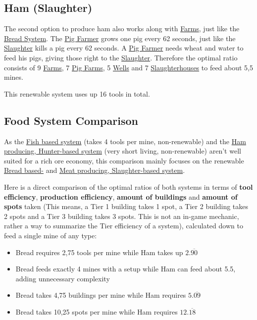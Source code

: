 \documentclass[12pt]{article}
\begin{document}
\subsection{Ham (Slaughter)}
\label{sec:hamslaughter}

The second option to produce ham also works along with \hyperref[sec:farm]{Farms}, just like the \hyperref[sec:bread]{Bread System}. The \hyperref[sec:pigfarm]{Pig Farmer} grows one pig every 62 seconds, just like the \hyperref[sec:slaughterhouse]{Slaughter} kills a pig every 62 seconds. A \hyperref[sec:pigfarm]{Pig Farmer} needs wheat and water to feed his pigs, giving those right to the \hyperref[sec:slaughterhouse]{Slaughter}. Therefore the optimal ratio consists of 9 \hyperref[sec:farm]{Farms}, 7 \hyperref[sec:pigfarm]{Pig Farms}, 5 \hyperref[sec:well]{Wells} and 7 \hyperref[sec:slaughterhouse]{Slaughterhouses} to feed about 5,5 mines.

This renewable system uses up 16 tools in total.

\subsection{Food System Comparison}
\label{sec:foodsystemcomparison}

As the \hyperref[sec:fish]{Fish based system} (takes 4 tools per mine, non-renewable) and the \hyperref[sec:hamhunter]{Ham producing, Hunter-based system} (very short living, non-renewable) aren't well suited for a rich ore economy, this comparison mainly focuses on the renewable \hyperref[sec:bread]{Bread based-} and \hyperref[sec:hamslaughter]{Meat producing, Slaughter-based system}.

Here is a direct comparison of the optimal ratios of both systems in terms of \textbf{tool efficiency}, \textbf{production efficiency}, \textbf{amount of buildings} and \textbf{amount of spots} taken (This means, a Tier 1 building takes 1 spot, a Tier 2 building takes 2 spots and a Tier 3 building takes 3 spots. This is not an in-game mechanic, rather a way to summarize the Tier efficiency of a system), calculated down to feed a single mine of any type:

\begin{itemize}
  \item Bread requires 2,75 tools per mine while Ham takes up $2.\overline{90}$
  \item Bread feeds exactly 4 mines with a setup while Ham can feed about 5.5, adding unnecessary complexity
  \item Bread takes 4,75 buildings per mine while Ham requires $5.\overline{09}$
  \item Bread takes 10,25 spots per mine while Ham requires $12.\overline{18}$
\end{itemize}
\end{document}
